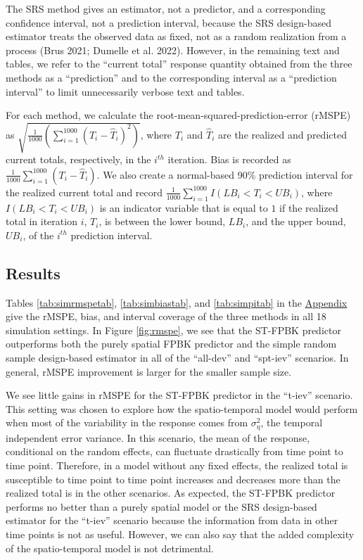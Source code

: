 \documentclass[smallextended]{svjour3}       %
\begin{document}
The SRS method gives an estimator, not a predictor, and a corresponding
confidence interval, not a prediction interval, because the SRS
design-based estimator treats the observed data as fixed, not as a
random realization from a process (Brus 2021; Dumelle et al. 2022).
However, in the remaining text and tables, we refer to the ``current
total'' response quantity obtained from the three methods as a
``prediction'' and to the corresponding interval as a ``prediction
interval'' to limit unnecessarily verbose text and tables.

For each method, we calculate the root-mean-squared-prediction-error
(rMSPE) as
\(\sqrt{\frac{1}{1000}(\sum_{i = 1}^{1000}(T_i - \hat{T}_i)^2)}\), where
\(T_i\) and \(\hat{T}_i\) are the realized and predicted current totals,
respectively, in the \(i^{th}\) iteration. Bias is recorded as
\(\frac{1}{1000}\sum_{i = 1}^{1000}(T_i - \hat{T}_i)\). We also create a
normal-based 90\% prediction interval for the realized current total and
record \(\frac{1}{1000} \sum_{i = 1}^{1000}I(LB_i < T_i < UB_i)\), where
\(I(LB_i < T_i < UB_i)\) is an indicator variable that is equal to \(1\)
if the realized total in iteration \(i\), \(T_i\), is between the lower
bound, \(LB_i\), and the upper bound, \(UB_i\), of the \(i^{th}\)
prediction interval.

\hypertarget{results}{%
\subsection{Results}\label{results}}

Tables \ref{tab:simrmspetab}, \ref{tab:simbiastab}, and
\ref{tab:simpitab} in the \protect\hyperlink{appendix}{Appendix} give
the rMSPE, bias, and interval coverage of the three methods in all 18
simulation settings. In Figure \ref{fig:rmspe}, we see that the ST-FPBK
predictor outperforms both the purely spatial FPBK predictor and the
simple random sample design-based estimator in all of the ``all-dev''
and ``spt-iev'' scenarios. In general, rMSPE improvement is larger for
the smaller sample size.

We see little gains in rMSPE for the ST-FPBK predictor in the ``t-iev''
scenario. This setting was chosen to explore how the spatio-temporal
model would perform when most of the variability in the response comes
from \(\sigma^2_{\eta}\), the temporal independent error variance. In
this scenario, the mean of the response, conditional on the random
effects, can fluctuate drastically from time point to time point.
Therefore, in a model without any fixed effects, the realized total is
susceptible to time point to time point increases and decreases more
than the realized total is in the other scenarios. As expected, the
ST-FPBK predictor performs no better than a purely spatial model or the
SRS design-based estimator for the ``t-iev'' scenario because the
information from data in other time points is not as useful. However, we
can also say that the added complexity of the spatio-temporal model is
not detrimental.
\end{document}
